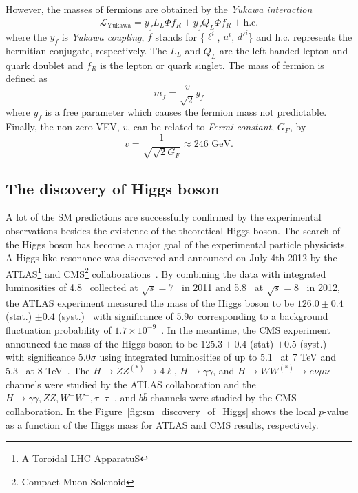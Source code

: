 %
However, the masses of fermions are obtained by the \textit{Yukawa interaction}
%
\begin{equation}
    \mathcal{L}_{\textrm{Yukawa}} = y_{f} \bar{L}_{L} \Phi f_{R} + y_{f} \bar{Q}_{L} \Phi f_{R} + \textrm{h.c.}
\end{equation}
%
where the $y_{f}$ is \textit{Yukawa coupling}, $f$ stands for \{$\ell^{i}$, $u^{i}$, $d'^{i}$\} and h.c. represents the hermitian conjugate, respectively.
The $\bar{L}_{L}$ and $\bar{Q}_{L}$ are the left-handed lepton and quark doublet and $f_{R}$ is the lepton or quark singlet.
The mass of fermion is defined as
%
\begin{equation}
    m_{f} = \frac{v}{\sqrt{2}}y_{f}
\end{equation}
%
where $y_{f}$ is a free parameter which causes the fermion mass not predictable.
Finally, the non-zero VEV, $v$, can be related to \textit{Fermi constant}, $G_{F}$, by
%
\begin{equation}
    v = \frac{1}{\sqrt{\sqrt{2} G_{F}}} \approx 246 \textrm{~{GeV}}.
\end{equation}
%


\subsection{The discovery of Higgs boson}
A lot of the SM predictions are successfully confirmed by the experimental observations besides the existence of the theoretical Higgs boson. 
The search of the Higgs boson has become a major goal of the experimental particle physicists.
A Higgs-like resonance was discovered and announced on July 4th 2012 by the ATLAS\footnote{A Toroidal LHC ApparatuS} and CMS\footnote{Compact Muon Solenoid} collaborations~\cite{Aad:2012tfa, Chatrchyan:2012xdj}.
By combining the data with integrated luminosities of 4.8~{\ifb} collected at $\sqrt{s} = 7$~{\TeV} in 2011 and 5.8~{\ifb} at $\sqrt{s}=8$~{\TeV} in 2012, the ATLAS experiment measured the mass of the Higgs boson to be $126.0 \pm 0.4$ (stat.) $\pm 0.4$ (syst.)~{\GeV} with significance of 5.9$\sigma$ corresponding to a background fluctuation probability of $1.7 \times 10^{-9}$~\cite{Aad:2012tfa}.
In the meantime, the CMS experiment announced the mass of the Higgs boson to be $125.3 \pm 0.4$ (stat) $\pm 0.5$ (syst.)~{\GeV} with significance 5.0$\sigma$ using integrated luminosities of up to 5.1~{\ifb} at 7 TeV and 5.3~{\ifb} at 8 TeV~\cite{Chatrchyan:2012xdj}. 
The $H \rightarrow ZZ^{(*)} \rightarrow 4\ell$, $H \rightarrow \gamma \gamma$, and $H \rightarrow WW^{(*)} \rightarrow e\nu\mu\nu$ channels were studied by the ATLAS collaboration and the $H \rightarrow \gamma \gamma, ZZ, W^{+}W^{-}, \tau^{+}\tau^{-}$, and $b\bar{b}$ channels were studied by the CMS collaboration.
In the Figure~\ref{fig:sm_discovery_of_Higgs} shows the local $p$-value as a function of the Higgs mass for ATLAS and CMS results, respectively.

